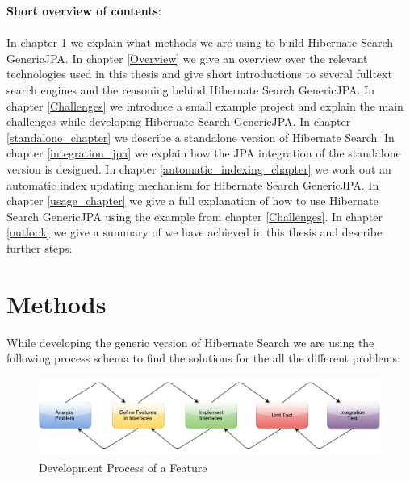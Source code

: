 \pagebreak

\noindent
\textbf{Short overview of contents}:
\\\\
\noindent
In chapter \ref{Methods} we explain what methods we are using to build Hibernate Search GenericJPA. In chapter \ref{Overview} we give an overview over the relevant technologies used in this thesis and give short introductions to several fulltext search engines and the reasoning behind Hibernate Search GenericJPA. In chapter \ref{Challenges} we introduce a small example project and explain the main challenges while developing Hibernate Search GenericJPA. In chapter \ref{standalone_chapter} we describe a standalone version of Hibernate Search. In chapter \ref{integration_jpa} we explain how the JPA integration of the standalone version is designed. In chapter \ref{automatic_indexing_chapter} we work out an automatic index updating mechanism for Hibernate Search GenericJPA. In chapter \ref{usage_chapter} we give a full explanation of how to use Hibernate Search GenericJPA using the example from chapter \ref{Challenges}. In chapter \ref{outlook} we give a summary of we have achieved in this thesis and describe further steps.

\pagebreak

\pagebreak

\section{Methods} \label{Methods}


While developing the generic version of Hibernate Search we are using the following process schema to find the solutions for the all the different problems:

\begin{figure}[ht]
	\centering
	\includegraphics[scale=0.52]{images/work_process.pdf}
	\caption{Development Process of a Feature}
	\label{development_process_of_a_feature}
\end{figure}

